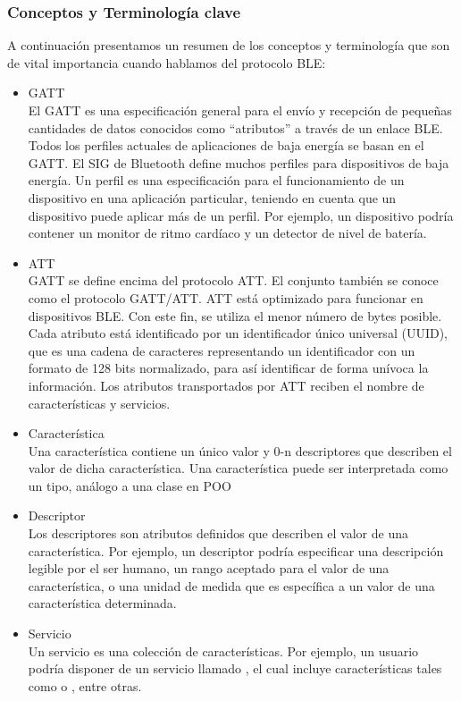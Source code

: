 \subsubsection{Conceptos y Terminología clave}
A continuación presentamos un resumen de los conceptos y terminología que son de vital importancia cuando hablamos del protocolo BLE:
\begin{itemize}
\item \ac{GATT} \\ El \ac{GATT} es una especificación general para el envío y recepción de pequeñas cantidades de datos conocidos como ``atributos'' a través de un enlace BLE. Todos los perfiles actuales de aplicaciones de baja energía se basan en el GATT.
El SIG de Bluetooth define muchos perfiles para dispositivos de baja energía. Un perfil es una especificación para el funcionamiento de un dispositivo en una aplicación particular, teniendo en cuenta que un dispositivo puede aplicar más de un perfil. Por ejemplo, un dispositivo podría contener un monitor de ritmo cardíaco y un detector de nivel de batería.
\item \ac{ATT} \\ \ac{GATT} se define encima del protocolo \ac{ATT}. El conjunto también se conoce como el protocolo GATT/ATT. ATT está optimizado para funcionar en dispositivos BLE. Con este fin, se utiliza el menor número de bytes posible. Cada atributo está identificado por un identificador único universal (UUID), que es una cadena de caracteres representando un identificador con un formato de 128 bits normalizado, para así identificar de forma unívoca la información. Los atributos transportados por ATT reciben el nombre de características y servicios.
\item Característica \\ Una característica contiene un único valor y 0-n descriptores que describen el valor de dicha característica. Una característica puede ser interpretada como un tipo, análogo a una clase en \ac{POO}
\item Descriptor \\ Los descriptores son atributos definidos que describen el valor de una característica. Por ejemplo, un descriptor podría especificar una descripción legible por el ser humano, un rango aceptado para el valor de una característica, o una unidad de medida que es específica a un valor de una característica determinada.
\item Servicio \\ Un servicio es una colección de características. Por ejemplo, un usuario podría disponer de un servicio llamado , el cual incluye características tales como  o , entre otras.
\end{itemize}

